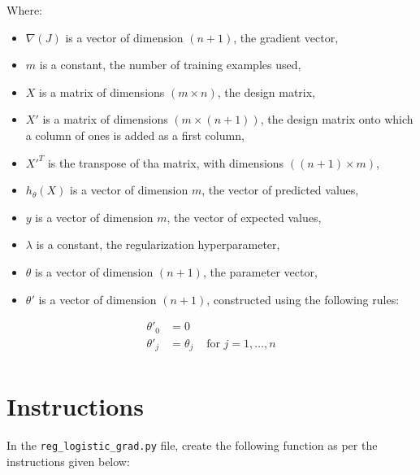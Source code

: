 \documentclass{42-en}
\begin{document}
Where:
\begin{itemize}
  \item $\nabla(J)$ is a vector of dimension $(n + 1)$, the gradient vector,
  \item $m$ is a constant, the number of training examples used,
  \item $X$ is a matrix of dimensions $(m \times n)$, the design matrix,
  \item $X'$ is a matrix of dimensions $(m \times (n + 1))$, the design matrix onto which a column of ones is added as a first column,
  \item $X'^T$ is the transpose of tha matrix, with dimensions $((n + 1) \times m)$,
  \item $h_\theta(X)$ is a vector of dimension $m$, the vector of predicted values, 
  \item $y$ is a vector of dimension $m$, the vector of expected values,
  \item $\lambda$ is a constant, the regularization hyperparameter,
  \item $\theta$ is a vector of dimension $(n + 1)$, the parameter vector,
  \item $\theta'$ is a vector of dimension $(n + 1)$, constructed using the following rules: 
\end{itemize}

$$
\begin{matrix}
\theta'_0 & =  0 \\
\theta'_j & =  \theta_j & \text{ for } j = 1, \dots, n\\
\end{matrix}
$$

\section*{Instructions}
In the \texttt{reg\_logistic\_grad.py} file, create the following function as per the instructions given below:
\end{document}

